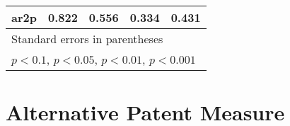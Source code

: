 \begin{table}
\begin{center}
{\begin{tabular}{l*{4}{c}}
ar2p                &       0.822         &       0.556         &       0.334         &       0.431         \\
\hline\hline
\multicolumn{5}{l}{\footnotesize Standard errors in parentheses}\\
\multicolumn{5}{l}{\footnotesize \sym{+} \(p<0.1\), \sym{*} \(p<0.05\), \sym{**} \(p<0.01\), \sym{***} \(p<0.001\)}\\
\end{tabular}
}
\end{center}
\end{table}

\section{Alternative Patent Measure}

